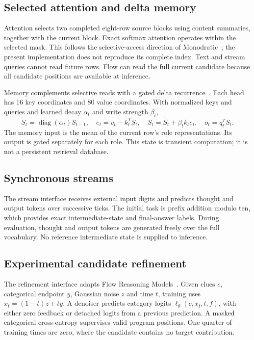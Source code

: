 \documentclass[11pt]{article}
\begin{document}
\subsection{Selected attention and delta memory}
Attention selects two completed eight-row source blocks using content
summaries, together with the current block. Exact softmax attention operates
within the selected mask. This follows the selective-access direction of
Monodratic~\cite{monodratic}; the present implementation does not reproduce its complete index.
Text and stream queries cannot read future rows. Flow can read the full
current candidate because all candidate positions are available at inference.

Memory complements selective reads with a gated delta recurrence~\cite{kda}.
Each head has 16 key coordinates and 80 value coordinates. With normalized
keys and queries and learned decay $\alpha_t$ and write strength $\beta_t$,
\begin{equation}
 \widetilde S_t=\operatorname{diag}(\alpha_t)S_{t-1},\quad
 e_t=v_t-k_t^{\!T}\widetilde S_t,\quad
 S_t=\widetilde S_t+\beta_t k_t e_t,\quad o_t=q_t^{\!T}S_t.
\end{equation}
The memory input is the mean of the current row's role representations. Its
output is gated separately for each role. This state is transient computation;
it is not a persistent retrieval database.

\subsection{Synchronous streams}
The stream interface receives external input digits and predicts thought and
output tokens over successive ticks. The initial task is prefix addition
modulo ten, which provides exact intermediate-state and final-answer labels.
During evaluation, thought and output tokens are generated freely over the
full vocabulary. No reference intermediate state is supplied to inference.

\subsection{Experimental candidate refinement}
The refinement interface adapts Flow Reasoning Models~\cite{frm}. Given clues
$c$, categorical endpoint $y$, Gaussian noise $z$ and time $t$, training uses
$x_t=(1-t)z+ty$. A denoiser predicts category logits
$\ell_\theta(c,x_t,t,f)$, with either zero feedback or detached logits from a
previous prediction. A masked categorical cross-entropy supervises valid
program positions. One quarter of training times are zero, where the
candidate contains no target contribution.
\end{document}
